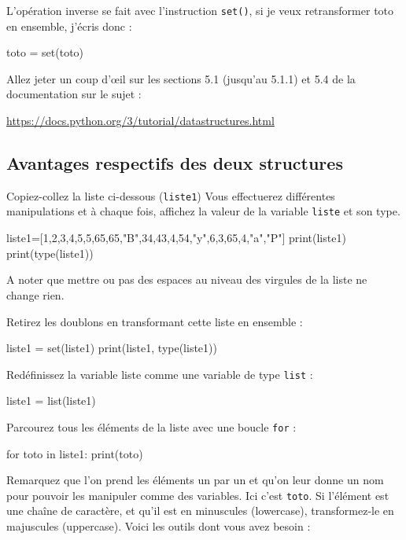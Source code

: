 L'opération inverse se fait avec l'instruction \texttt{set()}, si je veux retransformer toto en ensemble, j'écris donc  :

\begin{python}
toto = set(toto)
\end{python}

 Allez jeter un coup d'œil sur les sections 5.1 (jusqu'au 5.1.1) et 5.4 de la documentation sur le sujet : 

 \url{https://docs.python.org/3/tutorial/datastructures.html}\\

\subsection{Avantages respectifs des deux structures}

\exer

 Copiez-collez la liste ci-dessous (\texttt{liste1}) Vous effectuerez différentes manipulations et à chaque fois, affichez la valeur de la variable \texttt{liste} et son type.

\begin{python}
liste1=[1,2,3,4,5,5,65,65,"B",34,43,4,54,"y",6,3,65,4,"a","P"]
print(liste1)
print(type(liste1))
\end{python}

A noter que mettre ou pas des espaces au niveau des virgules de la liste ne change rien.

 Retirez les doublons en transformant cette liste en ensemble :

\begin{python}
liste1 = set(liste1)
print(liste1, type(liste1))
\end{python}

 Redéfinissez la variable liste comme une variable de type \texttt{list} :

\begin{python}
liste1 = list(liste1)
\end{python}


Parcourez tous les éléments de la liste avec une boucle \texttt{for} :

\begin{python}
for toto in liste1:
  print(toto)
\end{python}

Remarquez que l'on prend les éléments un par un et qu'on leur donne un nom pour pouvoir les manipuler comme des variables. Ici c'est \texttt{toto}. 
 Si l'élément est une chaîne de caractère, et qu'il est en minuscules (lowercase), transformez-le en majuscules (uppercase). Voici les outils dont vous avez besoin :

